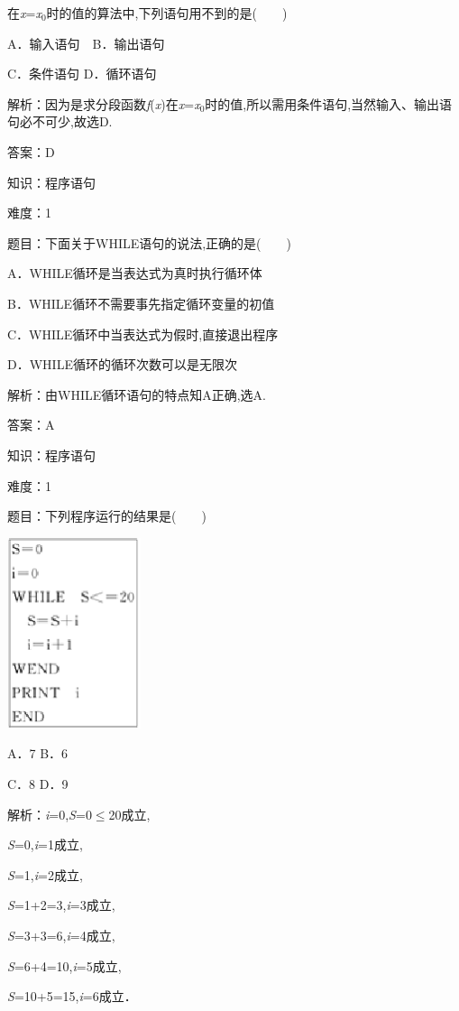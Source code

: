 \documentclass{article} %
\begin{document}
在\textit{x}=\textit{x}${}_{0}$时的值的算法中,下列语句用不到的是(　　)

A．输入语句　B．输出语句

C．条件语句  D．循环语句

解析：因为是求分段函数\textit{f}(\textit{x})在\textit{x}=\textit{x}${}_{0}$时的值,所以需用条件语句,当然输入、输出语句必不可少,故选D.

答案：D

知识：程序语句

难度：1

题目：下面关于WHILE语句的说法,正确的是(　　)

A．WHILE循环是当表达式为真时执行循环体

B．WHILE循环不需要事先指定循环变量的初值

C．WHILE循环中当表达式为假时,直接退出程序

D．WHILE循环的循环次数可以是无限次

解析：由WHILE循环语句的特点知A正确,选A.

答案：A

知识：程序语句

难度：1

题目：下列程序运行的结果是(　　)

\includegraphics*[width=1.55in, height=2.20in, keepaspectratio=false]{image61}

A．7  B．6

C．8  D．9

解析：\textit{i}=0,\textit{S}=0$\mathrm{\le}$20成立,

\textit{S}=0,\textit{i}=1成立,

\textit{S}=1,\textit{i}=2成立,

\textit{S}=1+2=3,\textit{i}=3成立,

\textit{S}=3+3=6,\textit{i}=4成立,

\textit{S}=6+4=10,\textit{i}=5成立,

\textit{S}=10+5=15,\textit{i}=6成立．
\end{document}
